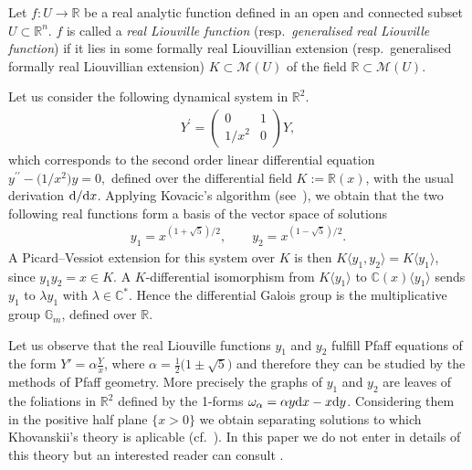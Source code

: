 \documentclass[pdftex]{sigma}%
\numberwithin{equation}{section}
\newcommand{\R}{\mathbb{R}}
\newcommand{\C}{\mathbb{C}}
\begin{document}
\begin{Definition} Let $f\colon U \to \R$ be a real analytic function defined in an open and connected subset $U \subset \R^n$. $f$ is called a \emph{real Liouville function} (resp.\ \emph{generalised real Liouville function}) if it lies in some formally real Liouvillian
extension (resp.\ generalised formally real Liouvillian extension) $K \subset \mathcal{M}(U)$ of the field $\R\subset \mathcal{M}(U)$.
\end{Definition}

\begin{Example} Let us consider the following dynamical system in $\mathbb{R}^2$.
\begin{gather*}
Y^{\prime}=\begin{pmatrix} 0 & 1 \\ 1/x^{2} & 0 \end{pmatrix}Y,
\end{gather*}
which corresponds to the second order linear differential equation $y^{\prime \prime
}-\big(1/x^{2}\big)y=0,$ defined over the differential field $K:=\mathbb{R}(x)$, with the usual derivation ${\rm d}/{\rm d}x$. Applying Kovacic's algorithm
(see~\cite[Section~7.3]{CHgsm}), we obtain that the two following real functions form a basis of the vector space of solutions
\begin{gather*}
y_{1}=x^{(1+\sqrt{5})/2}, \qquad y_{2}=x^{(1-\sqrt{5})/2}.
\end{gather*}
A Picard--Vessiot extension for this system over
$K$ is then $K\langle y_1, y_2 \rangle = K \langle y_1 \rangle$, since $y_{1}y_{2}=x\! \in\! K$. A $K$-differential isomorphism from $K \langle y_1 \rangle$ to $\C(x)\langle y_1 \rangle$ sends $y_{1}$ to $\lambda y_{1}$ with $\lambda \in \C^{\ast }$. Hence the differential Galois group is the multiplicative group $\mathbb{G}_m$, defined over $\R$.

Let us observe that the real Liouville functions $y_1$ and $y_2$ fulfill Pfaff equations of the form $Y'=\alpha \frac{Y}{x}$, where $\alpha= \frac 1 2 \big(1\pm \sqrt{5}\big)$ and therefore they can be studied by the methods of Pfaff geometry. More precisely the graphs of $y_{1}$ and $y_{2}$ are leaves of the foliations
in $\mathbb{R}^2$ defined by the 1-forms $\omega _{\alpha }=\alpha y{\rm d}x-x{\rm d}y$. Considering them in the positive half plane $\{x>0\}$ we obtain separating solutions to which Khovanskii's theory is aplicable (cf.\ \cite[pp.~4 and~5]{Kh}). In this paper we do not enter in details of this theory but an interested reader can consult \cite{Kh}.
\end{Example}
\end{document}
